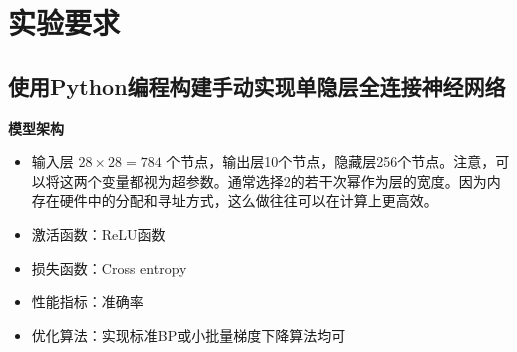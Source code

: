 \documentclass[12pt]{article}
\begin{document}
\section{实验要求}
\subsection{使用Python编程构建手动实现单隐层全连接神经网络}

\textbf{模型架构}
\begin{itemize}
  \item 输入层 \( 28 \times 28 = 784 \) 个节点，输出层10个节点，隐藏层256个节点。注意，可以将这两个变量都视为超参数。通常选择2的若干次幂作为层的宽度。因为内存在硬件中的分配和寻址方式，这么做往往可以在计算上更高效。
  \item 激活函数：ReLU函数
  \item 损失函数：Cross entropy
  \item 性能指标：准确率
  \item 优化算法：实现标准BP或小批量梯度下降算法均可
\end{itemize}
\end{document}
